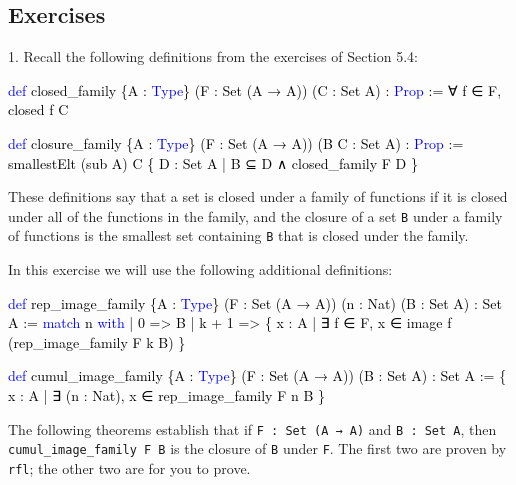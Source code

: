 \documentclass[
  letterpaper,
  DIV=11,
  numbers=noendperiod]{scrreprt}
\newenvironment{Shaded}{\begin{snugshade}}{\end{snugshade}}
\newcommand{\KeywordTok}[1]{\textcolor[rgb]{0.00,0.23,0.31}{#1}}
\newcommand{\NormalTok}[1]{\textcolor[rgb]{0.00,0.23,0.31}{#1}}
\renewcommand{\NormalTok}[1]{\textcolor[HTML]{000000}{#1}}
\renewcommand{\KeywordTok}[1]{\textcolor[HTML]{0000FF}{#1}}
\theoremstyle{remark}
\begin{document}
\hypertarget{exercises-18}{%
\subsection{Exercises}\label{exercises-18}}

1. Recall the following definitions from the exercises of Section 5.4:

\begin{Shaded}
\begin{Highlighting}[]
\KeywordTok{def}\NormalTok{ closed\_family \{A : }\KeywordTok{Type}\NormalTok{\} (F : Set (A → A)) (C : Set A) : }\KeywordTok{Prop}\NormalTok{ :=}
\NormalTok{  ∀ f ∈ F, closed f C}

\KeywordTok{def}\NormalTok{ closure\_family \{A : }\KeywordTok{Type}\NormalTok{\} (F : Set (A → A)) (B C : Set A) : }\KeywordTok{Prop}\NormalTok{ :=}
\NormalTok{  smallestElt (sub A) C \{ D : Set A | B ⊆ D ∧ closed\_family F D \}}
\end{Highlighting}
\end{Shaded}

These definitions say that a set is closed under a family of functions
if it is closed under all of the functions in the family, and the
closure of a set \texttt{B} under a family of functions is the smallest
set containing \texttt{B} that is closed under the family.

In this exercise we will use the following additional definitions:

\begin{Shaded}
\begin{Highlighting}[]
\KeywordTok{def}\NormalTok{ rep\_image\_family \{A : }\KeywordTok{Type}\NormalTok{\}}
\NormalTok{    (F : Set (A → A)) (n : Nat) (B : Set A) : Set A :=}
  \KeywordTok{match}\NormalTok{ n }\KeywordTok{with}
\NormalTok{    | 0 =\textgreater{} B}
\NormalTok{    | k + 1 =\textgreater{} \{ x : A | ∃ f ∈ F, x ∈ image f (rep\_image\_family F k B) \}}

\KeywordTok{def}\NormalTok{ cumul\_image\_family \{A : }\KeywordTok{Type}\NormalTok{\}}
\NormalTok{    (F : Set (A → A)) (B : Set A) : Set A :=}
\NormalTok{  \{ x : A | ∃ (n : Nat), x ∈ rep\_image\_family F n B \}}
\end{Highlighting}
\end{Shaded}

The following theorems establish that if \texttt{F\ :\ Set\ (A\ →\ A)}
and \texttt{B\ :\ Set\ A}, then \texttt{cumul\_image\_family\ F\ B} is
the closure of \texttt{B} under \texttt{F}. The first two are proven by
\texttt{rfl}; the other two are for you to prove.
\end{document}
